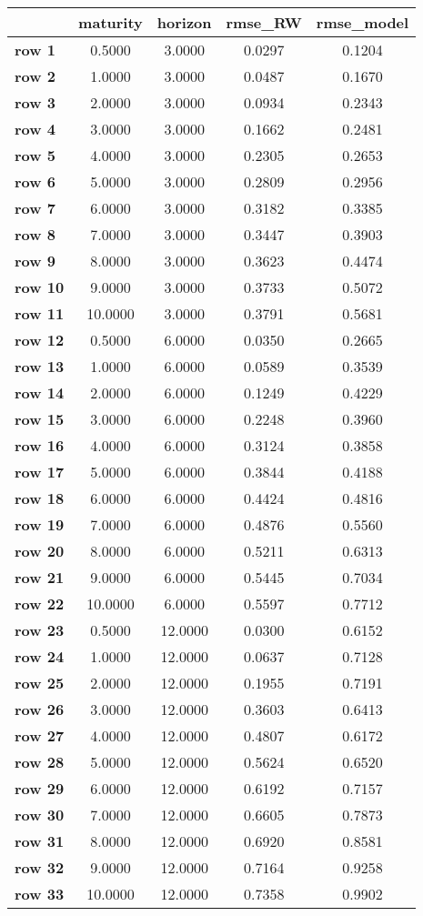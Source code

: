 \begin{tiny}\begin{tabular}{|l|c|c|c|c|}
\hline
&\textbf{maturity}&\textbf{horizon}&\textbf{rmse_RW}&\textbf{rmse_model}\\\hline
\textbf{row 1}&0.5000&3.0000&0.0297&0.1204\\\hline
\textbf{row 2}&1.0000&3.0000&0.0487&0.1670\\\hline
\textbf{row 3}&2.0000&3.0000&0.0934&0.2343\\\hline
\textbf{row 4}&3.0000&3.0000&0.1662&0.2481\\\hline
\textbf{row 5}&4.0000&3.0000&0.2305&0.2653\\\hline
\textbf{row 6}&5.0000&3.0000&0.2809&0.2956\\\hline
\textbf{row 7}&6.0000&3.0000&0.3182&0.3385\\\hline
\textbf{row 8}&7.0000&3.0000&0.3447&0.3903\\\hline
\textbf{row 9}&8.0000&3.0000&0.3623&0.4474\\\hline
\textbf{row 10}&9.0000&3.0000&0.3733&0.5072\\\hline
\textbf{row 11}&10.0000&3.0000&0.3791&0.5681\\\hline
\textbf{row 12}&0.5000&6.0000&0.0350&0.2665\\\hline
\textbf{row 13}&1.0000&6.0000&0.0589&0.3539\\\hline
\textbf{row 14}&2.0000&6.0000&0.1249&0.4229\\\hline
\textbf{row 15}&3.0000&6.0000&0.2248&0.3960\\\hline
\textbf{row 16}&4.0000&6.0000&0.3124&0.3858\\\hline
\textbf{row 17}&5.0000&6.0000&0.3844&0.4188\\\hline
\textbf{row 18}&6.0000&6.0000&0.4424&0.4816\\\hline
\textbf{row 19}&7.0000&6.0000&0.4876&0.5560\\\hline
\textbf{row 20}&8.0000&6.0000&0.5211&0.6313\\\hline
\textbf{row 21}&9.0000&6.0000&0.5445&0.7034\\\hline
\textbf{row 22}&10.0000&6.0000&0.5597&0.7712\\\hline
\textbf{row 23}&0.5000&12.0000&0.0300&0.6152\\\hline
\textbf{row 24}&1.0000&12.0000&0.0637&0.7128\\\hline
\textbf{row 25}&2.0000&12.0000&0.1955&0.7191\\\hline
\textbf{row 26}&3.0000&12.0000&0.3603&0.6413\\\hline
\textbf{row 27}&4.0000&12.0000&0.4807&0.6172\\\hline
\textbf{row 28}&5.0000&12.0000&0.5624&0.6520\\\hline
\textbf{row 29}&6.0000&12.0000&0.6192&0.7157\\\hline
\textbf{row 30}&7.0000&12.0000&0.6605&0.7873\\\hline
\textbf{row 31}&8.0000&12.0000&0.6920&0.8581\\\hline
\textbf{row 32}&9.0000&12.0000&0.7164&0.9258\\\hline
\textbf{row 33}&10.0000&12.0000&0.7358&0.9902\\\hline
\end{tabular}
\end{tiny}